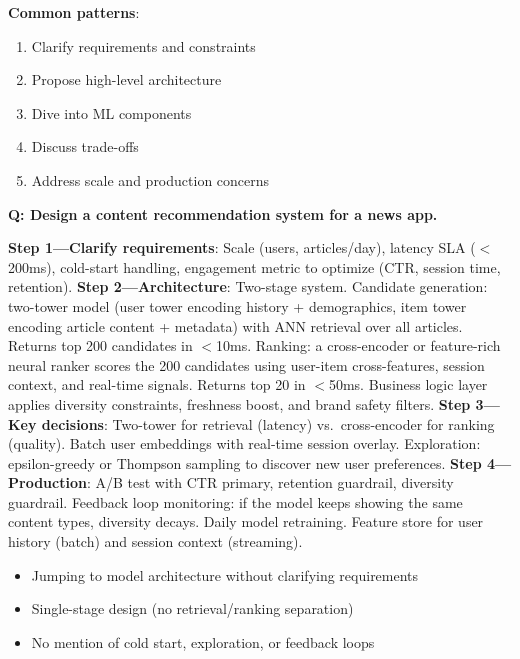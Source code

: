 \textbf{Common patterns}:
\begin{enumerate}
    \item Clarify requirements and constraints
    \item Propose high-level architecture
    \item Dive into ML components
    \item Discuss trade-offs
    \item Address scale and production concerns
\end{enumerate}

\begin{interviewq}
\textbf{Q: Design a content recommendation system for a news app.}

 \quad {} \quad \badgefreq{\freqhigh}

\stronganswer \textbf{Step 1---Clarify requirements}: Scale (users, articles/day), latency SLA ($<$200ms), cold-start handling, engagement metric to optimize (CTR, session time, retention). \textbf{Step 2---Architecture}: Two-stage system. Candidate generation: two-tower model (user tower encoding history + demographics, item tower encoding article content + metadata) with ANN retrieval over all articles. Returns top 200 candidates in $<$10ms. Ranking: a cross-encoder or feature-rich neural ranker scores the 200 candidates using user-item cross-features, session context, and real-time signals. Returns top 20 in $<$50ms. Business logic layer applies diversity constraints, freshness boost, and brand safety filters. \textbf{Step 3---Key decisions}: Two-tower for retrieval (latency) vs.\ cross-encoder for ranking (quality). Batch user embeddings with real-time session overlay. Exploration: epsilon-greedy or Thompson sampling to discover new user preferences. \textbf{Step 4---Production}: A/B test with CTR primary, retention guardrail, diversity guardrail. Feedback loop monitoring: if the model keeps showing the same content types, diversity decays. Daily model retraining. Feature store for user history (batch) and session context (streaming).

\redflags
\begin{itemize}
    \item Jumping to model architecture without clarifying requirements
    \item Single-stage design (no retrieval/ranking separation)
    \item No mention of cold start, exploration, or feedback loops
\end{itemize}


\end{interviewq}
